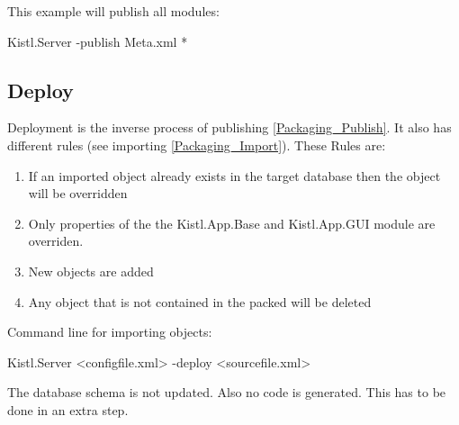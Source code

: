 This example will publish all modules:
\begin{CS}
Kistl.Server -publish Meta.xml *
\end{CS}


\subsection{\label{Packaging_Deploy}Deploy}

Deployment is the inverse process of publishing \ref{Packaging_Publish}. It also has different rules (see importing \ref{Packaging_Import}).
These Rules are:

\begin{enumerate}
 \item If an imported object already exists in the target database then the object will be overridden
 \item Only properties of the the Kistl.App.Base and Kistl.App.GUI module are overriden.
 \item New objects are added
 \item Any object that is not contained in the packed will be deleted
\end{enumerate}

Command line for importing objects:
\begin{CS}
Kistl.Server <configfile.xml> -deploy <sourcefile.xml>
\end{CS}

The database schema is not updated. Also no code is generated. This has to be done in an extra step.